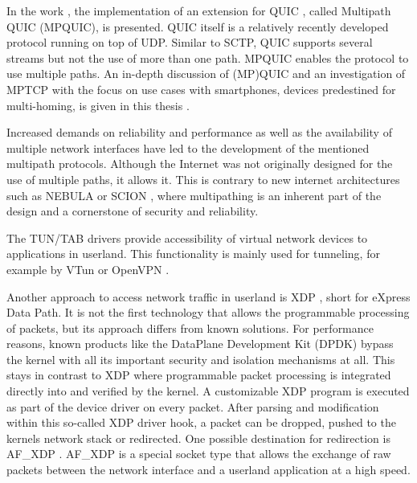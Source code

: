 In the work \cite{MPQUICPaper}, the implementation of an extension for QUIC \cite{quic-transport-29, QUICChromium}, called Multipath QUIC (MPQUIC), is presented. QUIC itself is a relatively recently developed protocol running on top of UDP. Similar to SCTP, QUIC supports several streams but not the use of more than one path. MPQUIC enables the protocol to use multiple paths. An in-depth discussion of (MP)QUIC and an investigation of MPTCP with the focus on use cases with smartphones, devices predestined for multi-homing, is given in this thesis \cite{MPQUICThesis}.

Increased demands on reliability and performance as well as the availability of multiple network interfaces have led to the development of the mentioned multipath protocols.  Although the Internet was not originally designed for the use of multiple paths, it allows it.  This is contrary to new internet architectures such as NEBULA \cite{NEBULA} or SCION \cite{SCIONPaper, SCIONBook}, where multipathing is an inherent part of the design and a cornerstone of security and reliability. 

The TUN/TAB drivers \cite{TUNTAPDriver} provide accessibility of virtual network devices to applications in userland. This functionality is mainly used for tunneling, for example by VTun \cite{VTun} or OpenVPN \cite{OpenVPN}. 

Another approach to access network traffic in userland is  XDP \cite{XDP,XDPGitHub}, short for eXpress Data Path. It is not the first technology that allows the programmable processing of packets, but its approach differs from known solutions. For performance reasons, known products like the  DataPlane Development Kit (DPDK) \cite{DPDK} bypass the kernel with all its important security and isolation mechanisms at all. This stays in contrast to XDP where programmable packet processing is integrated directly into and verified by the kernel. A customizable XDP program is executed as part of the device driver on every packet. After parsing and modification within this so-called XDP driver hook, a packet can be dropped, pushed to the kernels network stack or redirected. One possible destination for redirection is AF\_XDP \cite{AFXDPPaper, AFXDPWeb,AFXDPWeb2}. AF\_XDP  is a special socket type that allows the exchange of raw packets between the network interface and a userland application at a high speed. 
